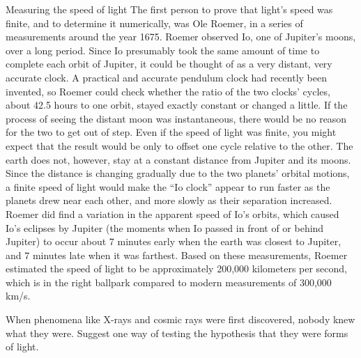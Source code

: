 \begin{envsubsection}{Measuring the speed of light}
The first person to prove that light's speed was finite, and to determine it
numerically, was Ole Roemer, in a series of measurements around the year
1675. Roemer observed Io, one of Jupiter's moons, over a long period.
Since Io presumably took the same amount of time to complete each orbit of
Jupiter, it could be thought of as a very distant, very accurate clock.
A practical and accurate pendulum clock had recently been invented, so
Roemer could check whether the ratio of the two clocks' cycles, about
42.5 hours to one orbit, stayed exactly constant or changed a little. If the
process of seeing the distant moon was instantaneous, there would be no reason
for the two to get out of step. Even if the speed of light was finite, you might
expect that the result would be only to offset one cycle relative to the other.
The earth does not, however, stay at a constant distance from Jupiter and its
moons. Since the distance is changing gradually due to the two planets' orbital
motions, a finite speed of light would make the ``Io clock'' appear to run
faster as the planets drew near each other, and more slowly as their
separation increased. Roemer did find a variation in the apparent speed of
Io's orbits, which caused Io's eclipses by Jupiter (the moments when Io passed
in front of or behind Jupiter) to occur about 7 minutes early when the
earth was closest to Jupiter, and 7 minutes late when it was farthest. Based on
these measurements, Roemer estimated the speed of light to be approximately
200,000 kilometers per second, which is in the right ballpark compared to modern measurements
of 300,000 km/s.
\end{envsubsection}

\dqheader
\begin{dq}
When phenomena like X-rays and cosmic rays were first discovered, nobody knew what they
were. Suggest one way of testing the hypothesis that they were forms of light.
\end{dq}

